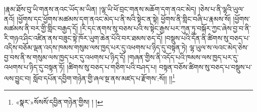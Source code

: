 །རྣམ་ཐོས་བུ་ཡི་གནས་ནའང་ཡོད་མ་ཡིན། །ལྷ་ཡི་ཕོ་བྲང་གནས་མཆོག་དག་ནའང་མེད། །ཅེས་པ་ནི་ལྷའི་ཡུལ་ནའོ། །ཕྱོགས་དང་ཕྱོགས་མཚམས་དག་ནའང་མེད་པ་ནི་སའི་སྟེང་ན་སྟེ། ཕྱོགས་ནི་གླིང་བཞི་པ་རྣམས་སོ། །ཕྱོགས་མཚམས་ནི་བར་གྱི་གླིང་བརྒྱད་དོ། །རི་དང་ནགས་སུ་བཅས་པའི་ས་སྟེང་རྒྱས་པར་ཀུན་ཏུ་བསྐོར་ཀྱང་ཞེས་བྱ་བ་ནི་རི་གཉའ་ཤིང་འཛིན་ནས་བཟུང་སྟེ་ཁོར་ཡུག་ཆེན་པོའི་བར་ཐམས་ཅད་དོ། །བསྡུས་པའི་དོན་ནི་ཚིགས་སུ་བཅད་པ་འདིས་བཅོམ་ལྡན་འདས་ཁམས་གསུམ་ལས་ཁྱད་པར་དུ་འཕགས་པ་ཉིད་དུ་བསྟན་ཏེ། ལྷ་ཡུལ་ས་ལའང་མེད་ཅེས་བྱ་བས་ནི་ས་གསུམ་ལས་ཁྱད་པར་དུ་འཕགས་པ་ཉིད་དོ། །གཞན་གྱིས་ནི་འདོད་པའི་ཁམས་ལས་ཁྱད་པར་དུ་འཕགས་པ་ཉིད་དུ་བསྟན་ཏོ། །ཚིགས་སུ་བཅད་པ་གཅིག་པའི་བཤད་པ། བསྟན་བཅོས་ཚིགས་སུ་བཅད་པ་བསྡུས་པ་ལས་བྱུང་བ། སློབ་དཔོན་དབྱིག་གཉེན་གྱི་ཞལ་སྔ་ནས་མཛད་པ་རྫོགས་:སོ།། །།\footnote{«སྣར་»སོསསོ་དབྱིན་གཉེན་གྱིས། ། །}